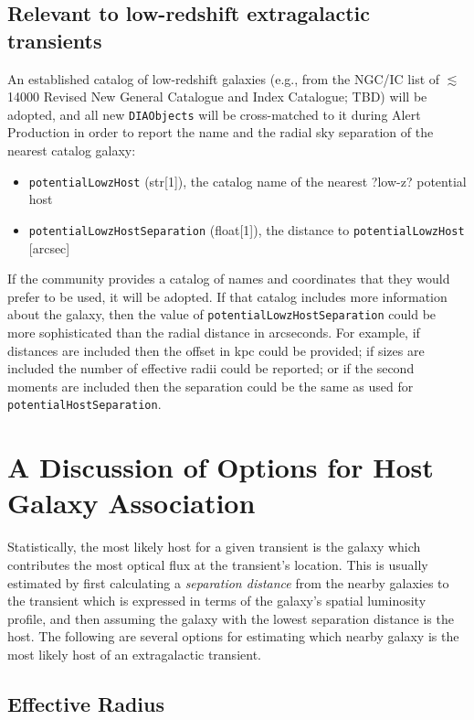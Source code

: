\documentclass[DM,authoryear,toc]{lsstdoc}
\begin{document}
\subsection{Relevant to low-redshift extragalactic transients}\label{ssec:params_lowz}

An established catalog of low-redshift galaxies (e.g., from the NGC/IC list of $\lesssim$14000 Revised New General Catalogue and Index Catalogue; TBD) will be adopted, and all new {\tt DIAObjects} will be cross-matched to it during Alert Production in order to report the name and the radial sky separation of the nearest catalog galaxy:
\begin{itemize}
\item {\tt potentialLowzHost} (str[1]), the catalog name of the nearest ?low-z? potential host
\item {\tt potentialLowzHostSeparation} (float[1]), the distance to {\tt potentialLowzHost} [arcsec]
\end{itemize}

If the community provides a catalog of names and coordinates that they would prefer to be used, it will be adopted. 
If that catalog includes more information about the galaxy, then the value of {\tt potentialLowzHostSeparation} could be more sophisticated than the radial distance in arcseconds. 
For example, if distances are included then the offset in kpc could be provided; if sizes are included the number of effective radii could be reported; or if the second moments are included then the separation could be the same as used for {\tt potentialHostSeparation}. 




\section{A Discussion of Options for Host Galaxy Association}\label{sec:options}

Statistically, the most likely host for a given transient is the galaxy which contributes the most optical flux at the transient's location.
This is usually estimated by first calculating a \emph{separation distance} from the nearby galaxies to the transient which is expressed in terms of the galaxy's spatial luminosity profile, and then assuming the galaxy with the lowest separation distance is the host.
The following are several options for estimating which nearby galaxy is the most likely host of an extragalactic transient.

\subsection{Effective Radius}\label{ssec:options_Re}
\end{document}
